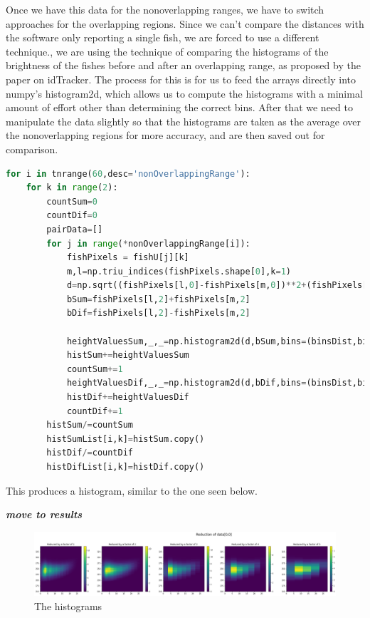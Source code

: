 \documentclass{article}
\begin{document}
Once we have this data for the nonoverlapping ranges, we have to switch approaches for the overlapping regions. Since we can't compare the distances with the software only reporting a single fish, we are forced to use a different technique., we are using the technique of comparing the histograms of the brightness of the fishes before and after an overlapping range, as proposed by the paper on idTracker\cite{idTracker}. The process for this is for us to feed the arrays directly into numpy's histogram2d, which allows us to compute the histograms with a minimal amount of effort other than determining the correct bins. After that we need to manipulate the data slightly so that the histograms are taken as the average over the nonoverlapping regions for more accuracy, and are then saved out for comparison.

\begin{minipage}[c]{\textwidth}
\begin{lstlisting}[language=Python]
for i in tnrange(60,desc='nonOverlappingRange'):
    for k in range(2):
        countSum=0
        countDif=0
        pairData=[]
        for j in range(*nonOverlappingRange[i]):
            fishPixels = fishU[j][k]
            m,l=np.triu_indices(fishPixels.shape[0],k=1)
            d=np.sqrt((fishPixels[l,0]-fishPixels[m,0])**2+(fishPixels[l,1]-fishPixels[m,1])**2)
            bSum=fishPixels[l,2]+fishPixels[m,2]
            bDif=fishPixels[l,2]-fishPixels[m,2]

            heightValuesSum,_,_=np.histogram2d(d,bSum,bins=(binsDist,binsSum))
            histSum+=heightValuesSum
            countSum+=1
            heightValuesDif,_,_=np.histogram2d(d,bDif,bins=(binsDist,binsDif))
            histDif+=heightValuesDif
            countDif+=1
        histSum/=countSum
        histSumList[i,k]=histSum.copy()
        histDif/=countDif
        histDifList[i,k]=histDif.copy()
\end{lstlisting}
\end{minipage}

This produces a histogram, similar to the one seen below.

\textbf{\textit{move to results}}

\begin{figure}[H]
	\centering
	\includegraphics[width=.75\linewidth]{reducedHist}
	\caption{The histograms}
	\label{fig:reducedHist}
\end{figure}
\end{document}
